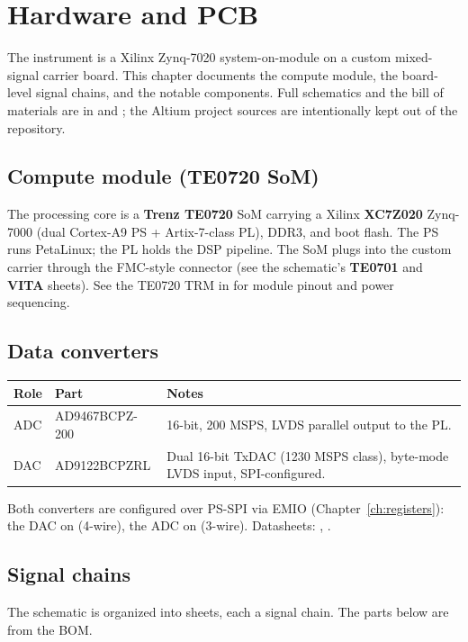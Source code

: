 \chapter{Hardware and PCB}
\label{ch:hardware}

The instrument is a Xilinx Zynq-7020 system-on-module on a custom mixed-signal
carrier board. This chapter documents the compute module, the board-level signal
chains, and the notable components. Full schematics and the bill of materials are
in  and ; the Altium project
sources are intentionally kept out of the repository.

\section{Compute module (TE0720 SoM)}
The processing core is a \textbf{Trenz TE0720} SoM carrying a Xilinx
\textbf{XC7Z020} Zynq-7000 (dual Cortex-A9 PS + Artix-7-class PL), DDR3, and boot
flash. The PS runs PetaLinux; the PL holds the DSP pipeline. The SoM plugs into
the custom carrier through the FMC-style connector (see the schematic's
\textbf{TE0701} and \textbf{VITA} sheets). See the TE0720 TRM in
 for module pinout and power sequencing.

\section{Data converters}
\begin{center}
\begin{tabular}{@{}l l p{7.4cm}@{}}
\toprule
Role & Part & Notes \\
\midrule
ADC & AD9467BCPZ-200 & 16-bit, 200 MSPS, LVDS parallel output to the PL. \\
DAC & AD9122BCPZRL   & Dual 16-bit TxDAC (1230 MSPS class), byte-mode LVDS input, SPI-configured. \\
\bottomrule
\end{tabular}
\end{center}
Both converters are configured over PS-SPI via EMIO (Chapter~\ref{ch:registers}):
the DAC on  (4-wire), the ADC on 
(3-wire). Datasheets: \cite{ad9122}, \cite{ad9467}.

\section{Signal chains}
The schematic is organized into sheets, each a signal chain. The parts below are
from the BOM.

